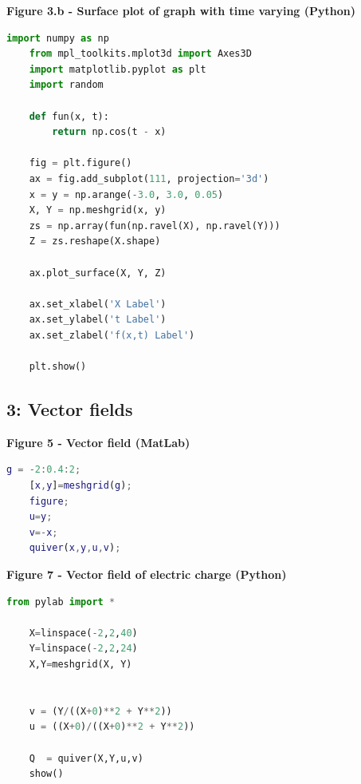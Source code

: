 \documentclass[10pt,a4paper]{article}
\begin{document}
\textbf{Figure 3.b - Surface plot of graph with time varying (Python)} 
\begin{lstlisting}[language=Python]
    import numpy as np
    from mpl_toolkits.mplot3d import Axes3D  
    import matplotlib.pyplot as plt
    import random

    def fun(x, t):
        return np.cos(t - x)

    fig = plt.figure()
    ax = fig.add_subplot(111, projection='3d')
    x = y = np.arange(-3.0, 3.0, 0.05)
    X, Y = np.meshgrid(x, y)
    zs = np.array(fun(np.ravel(X), np.ravel(Y)))
    Z = zs.reshape(X.shape)

    ax.plot_surface(X, Y, Z)

    ax.set_xlabel('X Label')
    ax.set_ylabel('t Label')
    ax.set_zlabel('f(x,t) Label')

    plt.show()
\end{lstlisting}

\subsection{3: Vector fields}

\textbf{Figure 5 - Vector field (MatLab)} 
\begin{lstlisting}[language=MatLab]
    g = -2:0.4:2;
    [x,y]=meshgrid(g);
    figure;
    u=y;
    v=-x;
    quiver(x,y,u,v);
\end{lstlisting}

\textbf{Figure 7 - Vector field of electric charge (Python)} 
\begin{lstlisting}[language=python]
    from pylab import *

    X=linspace(-2,2,40)
    Y=linspace(-2,2,24)
    X,Y=meshgrid(X, Y)


    v = (Y/((X+0)**2 + Y**2))
    u = ((X+0)/((X+0)**2 + Y**2))

    Q  = quiver(X,Y,u,v)
    show()
\end{lstlisting}
\end{document}
